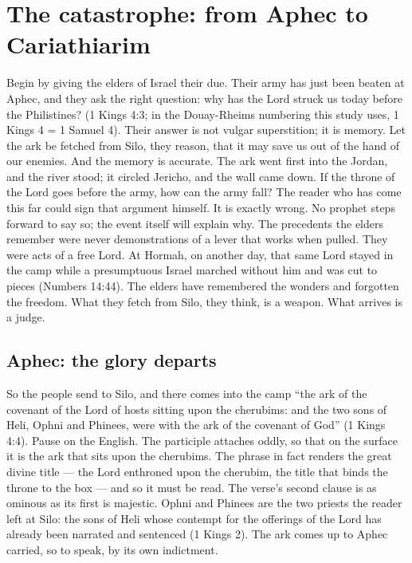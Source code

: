 \sectionguard
\section{The catastrophe: from Aphec to Cariathiarim}

Begin by giving the elders of Israel their due. Their army has just been
beaten at Aphec, and they ask the right question: why has the Lord struck us
today before the Philistines? (1 Kings 4:3; in the Douay-Rheims numbering
this study uses, 1 Kings 4 = 1 Samuel 4). Their answer is not vulgar
superstition; it is memory. Let the ark be fetched from Silo, they reason,
that it may save us out of the hand of our enemies. And the memory is
accurate. The ark went first into the Jordan, and the river stood; it
circled Jericho, and the wall came down. If the throne of the Lord goes
before the army, how can the army fall? The reader who has come this far
could sign that argument himself. It is exactly wrong. No prophet steps
forward to say so; the event itself will explain why. The precedents the
elders remember were never demonstrations of a lever that works when pulled.
They were acts of a free Lord. At Hormah, on another day, that same Lord
stayed in the camp while a presumptuous Israel marched without him and was
cut to pieces (Numbers 14:44). The elders have remembered the wonders and
forgotten the freedom. What they fetch from Silo, they think, is a weapon.
What arrives is a judge.

\subsection{Aphec: the glory departs}

So the people send to Silo, and there comes into the camp ``the ark of the
covenant of the Lord of hosts sitting upon the cherubims: and the two sons
of Heli, Ophni and Phinees, were with the ark of the covenant of
God'' (1 Kings 4:4).
Pause on the English. The participle attaches oddly, so that on the surface
it is the ark that sits upon the cherubims. The phrase in fact renders the
great divine title --- the Lord enthroned upon the cherubim, the title
that binds the throne to the box --- and so it must be read. The verse's second clause is as ominous as its first is majestic.
Ophni and Phinees are the two priests the reader left at Silo: the sons of
Heli whose contempt for the offerings of the Lord has already been narrated
and sentenced (1 Kings 2). The ark comes up to Aphec carried, so to speak,
by its own indictment.

